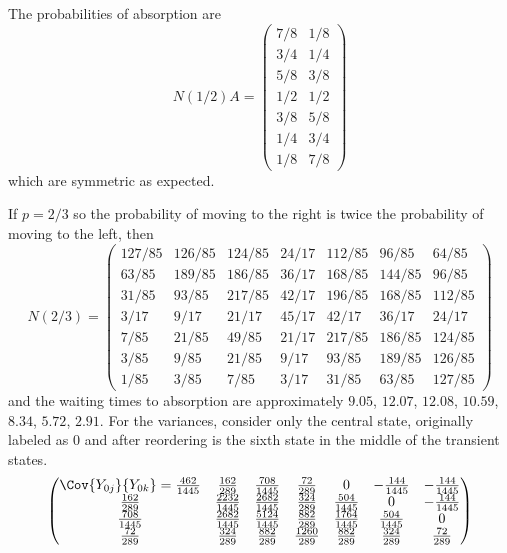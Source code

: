 \documentclass[12pt]{article}
\begin{document}
\begin{example}
    The probabilities of absorption are
    \[
        N(1/2) A =
        \begin{pmatrix}
            7/8 & 1/8\\
            3/4 & 1/4\\
            5/8 & 3/8\\
            1/2 & 1/2\\
            3/8 & 5/8\\
            1/4 & 3/4\\
            1/8 & 7/8
        \end{pmatrix}
    \] which are symmetric as expected.

    If \( p = 2/3 \) so the probability of moving to the right is twice
    the probability of moving to the left, then
    \[
        N(2/3) =
        \begin{pmatrix}
            127/85 & 126/85 & 124/85 & 24/17 & 112/85 & 96/85 & 64/85\\
            63/85 & 189/85 & 186/85 & 36/17 & 168/85 & 144/85 & 96/85\\
            31/85 & 93/85 & 217/85 & 42/17 & 196/85 & 168/85 & 112/85\\
            3/17 & 9/17 & 21/17 & 45/17 & 42/17 & 36/17 & 24/17\\
            7/85 & 21/85 & 49/85 & 21/17 & 217/85 & 186/85 & 124/85\\
            3/85 & 9/85 & 21/85 & 9/17 & 93/85 & 189/85 & 126/85\\
            1/85 & 3/85 & 7/85 & 3/17 & 31/85 & 63/85 & 127/85
        \end{pmatrix}
    \] and the waiting times to absorption are approximately \( 9.05 \),
    \( 12.07 \), \(12.08\), \(10.59\),
    \(8.34\), \(5.72\), \(2.91\). For the
    variances, consider only the central state, originally labeled as \(
    0 \) and after reordering is the sixth state in the middle of the
    transient states.
    \[\begin{pmatrix}
        \Cov{Y_{0j}}{Y_{0k}} =
        \frac{462}{1445} & \frac{162}{289} & \frac{708}{1445} & \frac{72}{289} & 0 & -\frac{144}{1445} & -\frac{144}{1445}\\
\frac{162}{289} & \frac{2232}{1445} & \frac{2682}{1445} & \frac{324}{289} & \frac{504}{1445} & 0 & -\frac{144}{1445}\\
\frac{708}{1445} & \frac{2682}{1445} & \frac{5124}{1445} & \frac{882}{289} & \frac{1764}{1445} & \frac{504}{1445} & 0\\
\frac{72}{289} & \frac{324}{289} & \frac{882}{289} & \frac{1260}{289} & \frac{882}{289} & \frac{324}{289} & \frac{72}{289}\\

\end{pmatrix}\]
\end{example}
\end{document}
